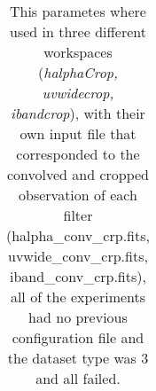 \documentclass[11pt,fleqn]{book} %
\begin{document}
\begin{table}[h!]
\begin{tabular}{ c c c c c c }
																																																																																																																																																																																																																																																																	          \hline
																																																																																																																																																																																																																																																																		    \end{tabular}
																																																																																																																																																																																																																																																																		      \caption{This parametes where used in three different workspaces (\emph{halphaCrop, uvwidecrop, ibandcrop}), with their own input file that corresponded to the convolved and cropped observation of each filter (halpha\_conv\_crp.fits, uvwide\_conv\_crp.fits, iband\_conv\_crp.fits), all of the experiments had no previous configuration file and the dataset type was 3 and all failed.}
																																																																																																																																																																																																																																																																		        \label{tab:threefail}
																																																																																																																																																																																																																																																																			\end{table}
\end{document}
